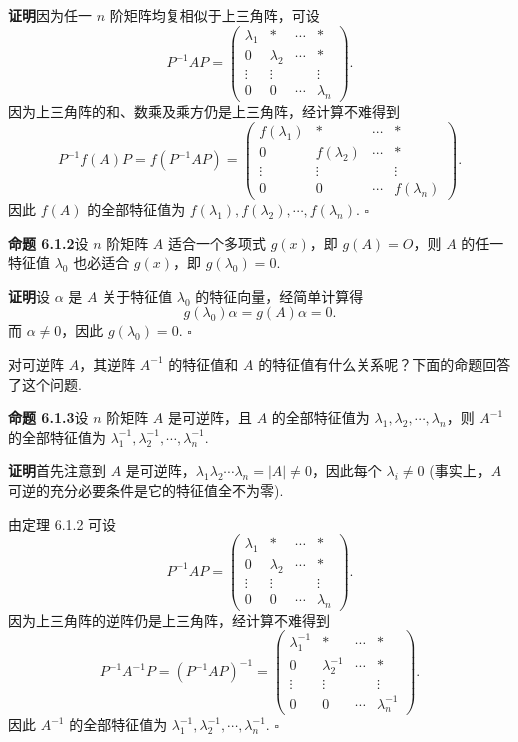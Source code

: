 \documentclass[UTF8, 12pt, fontset=fandol, oneside]{ctexart}
\begin{document}
\noindent\textbf{证明}\quad 因为任一 $n$ 阶矩阵均复相似于上三角阵，可设
\[
P^{-1}AP=
\left(\begin{array}{cccc}
\lambda_1 & * & \cdots & *\\
0 & \lambda_2 & \cdots & *\\
\vdots & \vdots & & \vdots\\
0 & 0 & \cdots & \lambda_n
\end{array}\right).
\]
因为上三角阵的和、数乘及乘方仍是上三角阵，经计算不难得到
\[
P^{-1}f(A)P=f(P^{-1}AP)=
\left(\begin{array}{cccc}
f(\lambda_1) & * & \cdots & *\\
0 & f(\lambda_2) & \cdots & *\\
\vdots & \vdots & & \vdots\\
0 & 0 & \cdots & f(\lambda_n)
\end{array}\right).
\]
因此 $f(A)$ 的全部特征值为 $f(\lambda_1),f(\lambda_2),\cdots,f(\lambda_n)$. $\square$

\noindent\textbf{命题 6.1.2}\quad 设 $n$ 阶矩阵 $A$ 适合一个多项式 $g(x)$，即 $g(A)=O$，则 $A$ 的任一特征值 $\lambda_0$ 也必适合 $g(x)$，即 $g(\lambda_0)=0$.

\noindent\textbf{证明}\quad 设 $\alpha$ 是 $A$ 关于特征值 $\lambda_0$ 的特征向量，经简单计算得
\[
g(\lambda_0)\alpha=g(A)\alpha=0.
\]
而 $\alpha\neq 0$，因此 $g(\lambda_0)=0$. $\square$

对可逆阵 $A$，其逆阵 $A^{-1}$ 的特征值和 $A$ 的特征值有什么关系呢？下面的命题回答了这个问题.

\noindent\textbf{命题 6.1.3}\quad 设 $n$ 阶矩阵 $A$ 是可逆阵，且 $A$ 的全部特征值为 $\lambda_1,\lambda_2,\cdots,\lambda_n$，则 $A^{-1}$ 的全部特征值为 $\lambda_1^{-1},\lambda_2^{-1},\cdots,\lambda_n^{-1}$.

\noindent\textbf{证明}\quad 首先注意到 $A$ 是可逆阵，$\lambda_1\lambda_2\cdots\lambda_n=|A|\neq 0$，因此每个 $\lambda_i\neq 0$ (事实上，$A$ 可逆的充分必要条件是它的特征值全不为零).

由定理 6.1.2 可设
\[
P^{-1}AP=
\left(\begin{array}{cccc}
\lambda_1 & * & \cdots & *\\
0 & \lambda_2 & \cdots & *\\
\vdots & \vdots & & \vdots\\
0 & 0 & \cdots & \lambda_n
\end{array}\right).
\]
因为上三角阵的逆阵仍是上三角阵，经计算不难得到
\[
P^{-1}A^{-1}P=(P^{-1}AP)^{-1}=
\left(\begin{array}{cccc}
\lambda_1^{-1} & * & \cdots & *\\
0 & \lambda_2^{-1} & \cdots & *\\
\vdots & \vdots & & \vdots\\
0 & 0 & \cdots & \lambda_n^{-1}
\end{array}\right).
\]
因此 $A^{-1}$ 的全部特征值为 $\lambda_1^{-1},\lambda_2^{-1},\cdots,\lambda_n^{-1}$. $\square$
\end{document}
